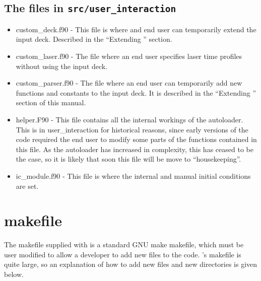 \documentclass[12pt,a4paper]{article}
\newcommand{\inlinecode}[1]{{\color{warwickred} \bf\texttt{#1}}}
\newcommand{\EPOCH}{{\color{warwickdark}\fontfamily{phv}\selectfont{EPOCH}}}
\begin{document}
\subsection{The files in \inlinecode{src/user\_interaction}}
\begin{itemize}
\item custom\_deck.f90 - This file is where and end user can temporarily
  extend the input deck. Described in the ``Extending {\EPOCH}'' section.
\item custom\_laser.f90 - The file where an end user specifies laser time
  profiles without using the input deck.
\item custom\_parser.f90 - The file where an end user can temporarily add new
  functions and constants to the input deck. It is described in the ``Extending
  {\EPOCH}'' section of this manual.
\item helper.F90 - This file contains all the internal workings of the
  autoloader. This is in user\_interaction for historical reasons, since early
  versions of the code required the end user to modify some parts of the
  functions contained in this file. As the autoloader has increased in
  complexity, this has ceased to be the case, so it is likely that soon this
  file will be move to ``housekeeping''.
\item ic\_module.f90 - This file is where the internal and manual initial
  conditions are set.
\end{itemize}

\section{{\EPOCH} makefile}
The makefile supplied with {\EPOCH} is a standard GNU make makefile, which must
be user modified to allow a developer to add new files to the code. {\EPOCH}'s
makefile is quite large, so an explanation of how to add new files and new
directories is given below.
\end{document}
